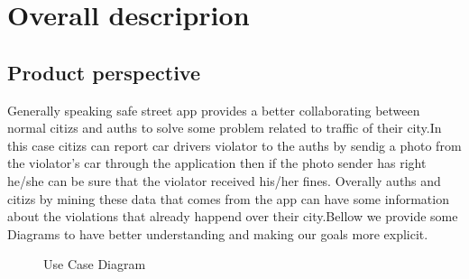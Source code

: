\documentclass{article}
\begin{document}

\newpage
\section{Overall descriprion}

	

	\subsection{Product perspective} Generally speaking safe street app provides a better collaborating between normal citizs and auths to solve some problem related to traffic of their city.In this case citizs can report car drivers violator to the auths by sendig a photo from the violator's car through the application then if the photo sender has right he/she can be sure that the violator received his/her fines. Overally auths and citizs by mining these data that comes from the app can have some information about the violations that already happend over their city.Bellow we provide some Diagrams to have better understanding and making our goals more explicit.
	
	\begin{figure}[H]
		\centering
		\def\svgwidth{\columnwidth}
		
		\caption{Use Case Diagram}
	\end{figure}

		
		
\end{document}
